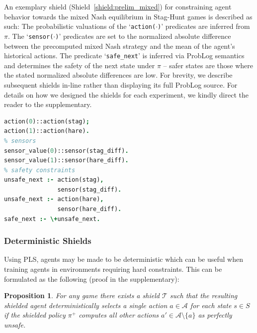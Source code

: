 \documentclass{ecai}
\newcommand{\shieldname}[1]{$\mathcal{T}_{#1}$}
\theoremstyle{plain}
\newtheorem{proposition}[theorem]{Proposition}
\theoremstyle{definition}
\theoremstyle{remark}
\begin{document}
An exemplary shield (Shield~\ref{shield:prelim_mixed}) for constraining agent behavior towards the mixed Nash equilibrium in Stag-Hunt games is described as such: The probabilistic valuations of the `\texttt{action($\cdot$)}' predicates are inferred from $\pi$. The `\texttt{sensor($\cdot$)}' predicates are set to the normalized absolute difference between the precomputed mixed Nash strategy and the mean of the agent's historical actions. The predicate `\texttt{safe\_next}' is inferred via ProbLog semantics \cite{cozman2017semantics} and determines the safety of the next state under $\pi$ -- safer states are those where the stated normalized absolute differences are low. For brevity, we describe subsequent shields in-line rather than displaying its full ProbLog source. For details on how we designed the shields for each experiment, we kindly direct the reader to the supplementary.
\begin{lstlisting}[language=Prolog, caption={Shield (\shieldname{mixed}) for mixed \textit{Stag-Hunt} equilibrum.}, label={shield:prelim_mixed}]
% actions
action(0)::action(stag);
action(1)::action(hare).
% sensors
sensor_value(0)::sensor(stag_diff).
sensor_value(1)::sensor(hare_diff).
% safety constraints
unsafe_next :- action(stag), 
               sensor(stag_diff).
unsafe_next :- action(hare), 
               sensor(hare_diff).
safe_next :- \+unsafe_next.
\end{lstlisting}
\vspace{-10pt}
\subsubsection{Deterministic Shields}
Using PLS, agents may be made to be deterministic which can be useful when training agents in environments requiring hard constraints. This can be formulated as the following (proof in the supplementary):
\begin{proposition} \label{proposition:deterministic}
    For any game there exists a shield $\mathcal{T}$ such that the resulting shielded agent deterministically selects a single action $a\in\mathcal{A}$ for each state $s\in S$ if the shielded policy $\pi^+$ computes all other actions $a'\in\mathcal{A}\setminus \{a\}$ as perfectly unsafe.
\end{proposition}

\end{document}
